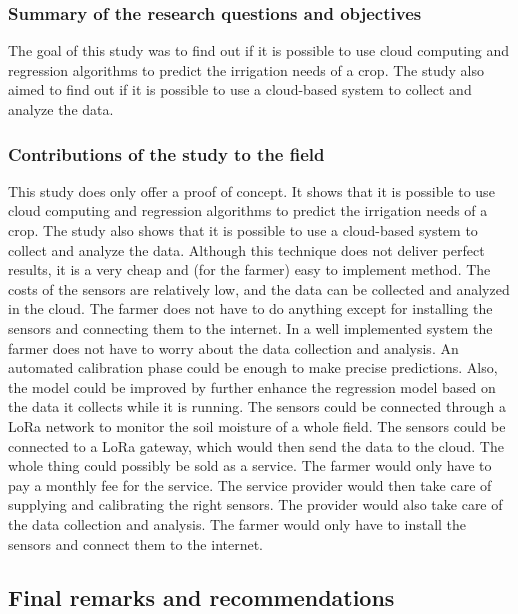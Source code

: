 \documentclass[11pt]{scrartcl} %
\begin{document}
\subsubsection{Summary of the research questions and objectives}
The goal of this study was to find out if it is possible to use cloud computing and regression algorithms to predict the irrigation needs of a crop. The study also aimed to find out if it is possible to use a cloud-based system to collect and analyze the data.

\subsubsection{Contributions of the study to the field}
This study does only offer a proof of concept. It shows that it is possible to use cloud computing and regression algorithms to predict the irrigation needs of a crop. The study also shows that it is possible to use a cloud-based system to collect and analyze the data.
\newline Although this technique does not deliver perfect results, it is a very cheap and (for the farmer) easy to implement method. The costs of the sensors are relatively low, and the data can be collected and analyzed in the cloud. The farmer does not have to do anything except for installing the sensors and connecting them to the internet. In a well implemented system the farmer does not have to worry about the data collection and analysis. An automated calibration phase could be enough to make precise predictions. Also, the model could be improved by further enhance the regression model based on the data it collects while it is running.
\newline The sensors could be connected through a LoRa network to monitor the soil moisture of a whole field. The sensors could be connected to a LoRa gateway, which would then send the data to the cloud.
\newline The whole thing could possibly be sold as a service. The farmer would only have to pay a monthly fee for the service. The service provider would then take care of supplying and calibrating the right sensors. The provider would also take care of the data collection and analysis. The farmer would only have to install the sensors and connect them to the internet.
\subsection{Final remarks and recommendations}


\newpage
\printbibliography[title=References]
\end{document}
